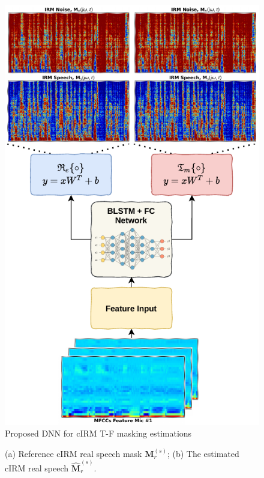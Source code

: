 \begin{figure}[H]
    \centering
    \includegraphics[width=0.75\linewidth]{Beamformers/images/cirm_nn}
    \caption{Proposed DNN for cIRM T-F masking estimations}\label{fig:cirm_nn}
\end{figure}


\begin{figure}[H]
    \centering
    \hspace{0.1cm}
    \caption{(a) Reference cIRM
        real speech mask \(\mathbf{M}^{(s)}_{r}\);\;\;
        (b) The estimated cIRM
        real speech \(\mathbf{\widehat{M}}^{(s)}_{r}\).}\label{fig:cirm_nn_vs_ref} 
\end{figure}

